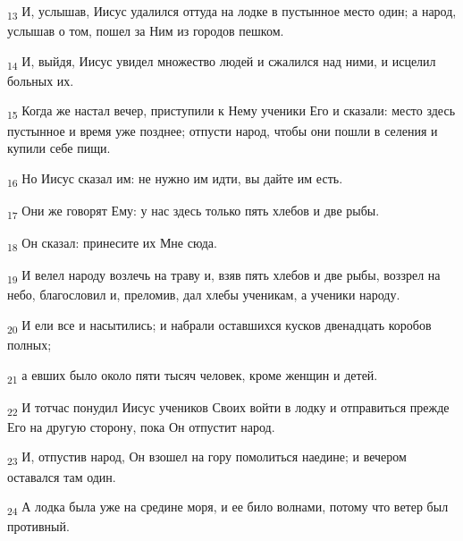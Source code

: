 \begin{tcolorbox}
\textsubscript{13} И, услышав, Иисус удалился оттуда на лодке в пустынное место один; а народ, услышав о том, пошел за Ним из городов пешком.
\end{tcolorbox}
\begin{tcolorbox}
\textsubscript{14} И, выйдя, Иисус увидел множество людей и сжалился над ними, и исцелил больных их.
\end{tcolorbox}
\begin{tcolorbox}
\textsubscript{15} Когда же настал вечер, приступили к Нему ученики Его и сказали: место здесь пустынное и время уже позднее; отпусти народ, чтобы они пошли в селения и купили себе пищи.
\end{tcolorbox}
\begin{tcolorbox}
\textsubscript{16} Но Иисус сказал им: не нужно им идти, вы дайте им есть.
\end{tcolorbox}
\begin{tcolorbox}
\textsubscript{17} Они же говорят Ему: у нас здесь только пять хлебов и две рыбы.
\end{tcolorbox}
\begin{tcolorbox}
\textsubscript{18} Он сказал: принесите их Мне сюда.
\end{tcolorbox}
\begin{tcolorbox}
\textsubscript{19} И велел народу возлечь на траву и, взяв пять хлебов и две рыбы, воззрел на небо, благословил и, преломив, дал хлебы ученикам, а ученики народу.
\end{tcolorbox}
\begin{tcolorbox}
\textsubscript{20} И ели все и насытились; и набрали оставшихся кусков двенадцать коробов полных;
\end{tcolorbox}
\begin{tcolorbox}
\textsubscript{21} а евших было около пяти тысяч человек, кроме женщин и детей.
\end{tcolorbox}
\begin{tcolorbox}
\textsubscript{22} И тотчас понудил Иисус учеников Своих войти в лодку и отправиться прежде Его на другую сторону, пока Он отпустит народ.
\end{tcolorbox}
\begin{tcolorbox}
\textsubscript{23} И, отпустив народ, Он взошел на гору помолиться наедине; и вечером оставался там один.
\end{tcolorbox}
\begin{tcolorbox}
\textsubscript{24} А лодка была уже на средине моря, и ее било волнами, потому что ветер был противный.
\end{tcolorbox}
